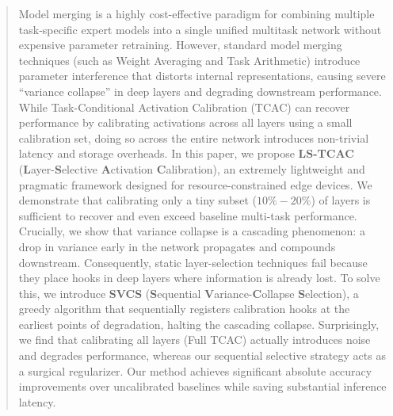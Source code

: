 \documentclass{article}
\theoremstyle{plain}
\theoremstyle{definition}
\theoremstyle{remark}
\begin{document}

\printAffiliationsAndNotice{}

\begin{abstract}
Model merging is a highly cost-effective paradigm for combining multiple task-specific expert models into a single unified multitask network without expensive parameter retraining. However, standard model merging techniques (such as Weight Averaging and Task Arithmetic) introduce parameter interference that distorts internal representations, causing severe ``variance collapse'' in deep layers and degrading downstream performance. While Task-Conditional Activation Calibration (TCAC) can recover performance by calibrating activations across all layers using a small calibration set, doing so across the entire network introduces non-trivial latency and storage overheads. In this paper, we propose \textbf{LS-TCAC} (\textbf{L}ayer-\textbf{S}elective \textbf{A}ctivation \textbf{C}alibration), an extremely lightweight and pragmatic framework designed for resource-constrained edge devices. We demonstrate that calibrating only a tiny subset ($10\%-20\%$) of layers is sufficient to recover and even exceed baseline multi-task performance. Crucially, we show that variance collapse is a cascading phenomenon: a drop in variance early in the network propagates and compounds downstream. Consequently, static layer-selection techniques fail because they place hooks in deep layers where information is already lost. To solve this, we introduce \textbf{SVCS} (\textbf{S}equential \textbf{V}ariance-\textbf{C}ollapse \textbf{S}election), a greedy algorithm that sequentially registers calibration hooks at the earliest points of degradation, halting the cascading collapse. Surprisingly, we find that calibrating all layers (Full TCAC) actually introduces noise and degrades performance, whereas our sequential selective strategy acts as a surgical regularizer. Our method achieves significant absolute accuracy improvements over uncalibrated baselines while saving substantial inference latency.
\end{abstract}
\end{document}
